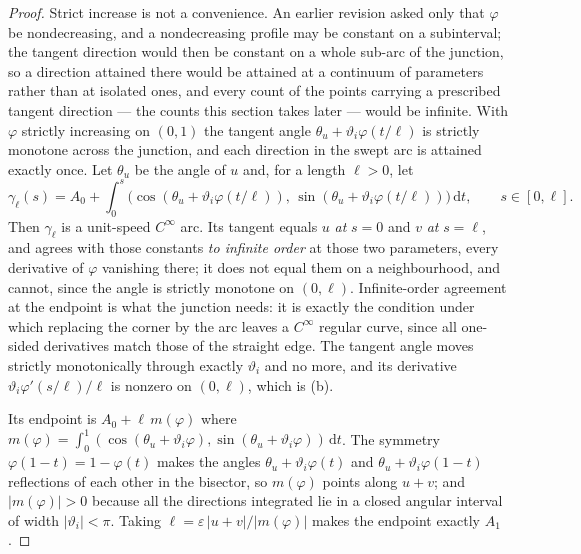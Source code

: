 \begin{proof}
Strict increase is not a convenience. An earlier revision asked only that
$\varphi$ be nondecreasing, and a nondecreasing profile may be constant on a
subinterval; the tangent direction would then be constant on a whole sub-arc of
the junction, so a direction attained there would be attained at a continuum of
parameters rather than at isolated ones, and every count of the points carrying
a prescribed tangent direction --- the counts this section takes later --- would
be infinite. With $\varphi$ strictly increasing on $(0,1)$ the tangent angle
$\theta_u+\vartheta_i\varphi(t/\ell)$ is strictly monotone across the junction, and
each direction in the swept arc is attained exactly once. Let
$\theta_u$ be the angle of $u$ and, for a length $\ell>0$, let
\[
   \gamma_\ell(s)=A_0+\int_0^{s}
   \bigl(\cos(\theta_u+\vartheta_i\varphi(t/\ell)),\,
         \sin(\theta_u+\vartheta_i\varphi(t/\ell))\bigr)\,\mathrm dt,
   \qquad s\in[0,\ell].
\]
Then $\gamma_\ell$ is a unit-speed $C^\infty$ arc. Its tangent equals $u$
\emph{at} $s=0$ and $v$ \emph{at} $s=\ell$, and agrees with those constants
\emph{to infinite order} at those two parameters, every derivative of $\varphi$
vanishing there; it does not equal them on a neighbourhood, and cannot, since
the angle is strictly monotone on $(0,\ell)$.
Infinite-order agreement at the endpoint is what the junction needs: it is
exactly the condition under which replacing the corner by the arc leaves a
$C^\infty$ regular curve, since all one-sided derivatives match those of the
straight edge. The tangent angle moves strictly monotonically through exactly
$\vartheta_i$ and no more, and its derivative
$\vartheta_i\varphi'(s/\ell)/\ell$ is nonzero on $(0,\ell)$, which is (b).

Its endpoint is $A_0+\ell\,m(\varphi)$ where
$m(\varphi)=\int_0^1(\cos(\theta_u+\vartheta_i\varphi),\sin(\theta_u+\vartheta_i\varphi))\,
\mathrm dt$. The symmetry $\varphi(1-t)=1-\varphi(t)$ makes the angles
$\theta_u+\vartheta_i\varphi(t)$ and $\theta_u+\vartheta_i\varphi(1-t)$ reflections of
each other in the bisector, so $m(\varphi)$ points along $u+v$; and
$|m(\varphi)|>0$ because all the directions integrated lie in a closed angular
interval of width $|\vartheta_i|<\pi$. Taking
$\ell=\varepsilon\,|u+v|/|m(\varphi)|$ makes the endpoint exactly $A_1$.


\end{proof}
